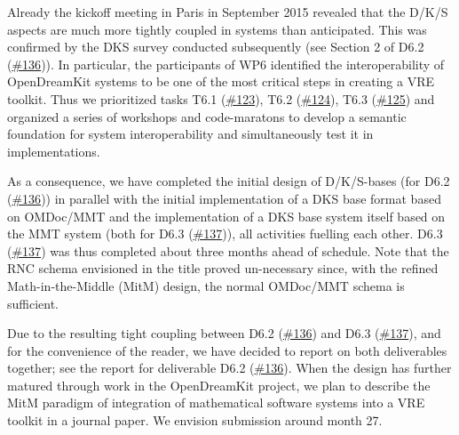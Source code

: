 Already the kickoff meeting in Paris in September 2015 revealed that the
D/K/S aspects are much more tightly coupled in systems than anticipated.
This was confirmed by the DKS survey conducted subsequently (see Section
2 of D6.2
(\href{https://github.com/OpenDreamKit/OpenDreamKit/issues/136}{\#136})).
In particular, the participants of WP6 identified the interoperability
of OpenDreamKit systems to be one of the most critical steps in creating
a VRE toolkit. Thus we prioritized tasks T6.1
(\href{https://github.com/OpenDreamKit/OpenDreamKit/issues/123}{\#123}),
T6.2
(\href{https://github.com/OpenDreamKit/OpenDreamKit/issues/124}{\#124}),
T6.3
(\href{https://github.com/OpenDreamKit/OpenDreamKit/issues/125}{\#125})
and organized a series of workshops and code-maratons to develop a
semantic foundation for system interoperability and simultaneously test
it in implementations.

As a consequence, we have completed the initial design of D/K/S-bases
(for D6.2
(\href{https://github.com/OpenDreamKit/OpenDreamKit/issues/136}{\#136}))
in parallel with the initial implementation of a DKS base format based
on OMDoc/MMT and the implementation of a DKS base system itself based on
the MMT system (both for D6.3
(\href{https://github.com/OpenDreamKit/OpenDreamKit/issues/137}{\#137})),
all activities fuelling each other. D6.3
(\href{https://github.com/OpenDreamKit/OpenDreamKit/issues/137}{\#137})
was thus completed about three months ahead of schedule. Note that the
RNC schema envisioned in the title proved un-necessary since, with the
refined Math-in-the-Middle (MitM) design, the normal OMDoc/MMT schema is
sufficient.

Due to the resulting tight coupling between D6.2
(\href{https://github.com/OpenDreamKit/OpenDreamKit/issues/136}{\#136})
and D6.3
(\href{https://github.com/OpenDreamKit/OpenDreamKit/issues/137}{\#137}),
and for the convenience of the reader, we have decided to report on both
deliverables together; see the report for deliverable D6.2
(\href{https://github.com/OpenDreamKit/OpenDreamKit/issues/136}{\#136}).
When the design has further matured through work in the OpenDreamKit
project, we plan to describe the MitM paradigm of integration of
mathematical software systems into a VRE toolkit in a journal paper. We
envision submission around month 27.
